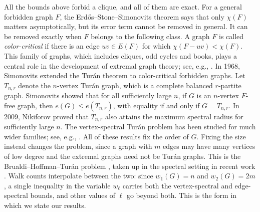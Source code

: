 \documentclass[11pt, a4paper]{article}
\theoremstyle{definition}
\theoremstyle{plain}
\renewcommand{\le}{\leqslant}
\begin{document}
\smallskip 

All the bounds above forbid a clique, and all of them are exact. For a general forbidden graph $F$, the Erd\H{o}s--Stone--Simonovits theorem says that only $\chi (F)$ matters asymptotically, but its error term cannot be removed in general. 
It can be removed exactly when $F$ belongs to the following class. 
A graph $F$ is called {\it color-critical} if there is an edge $uv\in E(F)$ for which $\chi(F- uv)<\chi(F)$. 
 This family of graphs, which includes cliques, odd cycles and books, plays a central role in the
development of extremal graph theory; see, e.g., \cite{Mub2010,PY2017,ZhaiLin2023}. 
In 1968, Simonovits \cite{Sim1968} extended the Tur\'{a}n theorem to color-critical forbidden graphs. 
 Let $T_{n,r}$ denote the $n$-vertex Tur\'{a}n graph, which is a complete balanced $r$-partite graph. Simonovits showed that for all sufficiently large $n$, if $G$ is an $n$-vertex $F$-free graph, 
 then $e(G)\le e(T_{n,r})$, with equality if and only if $G=T_{n,r}$. 
In 2009,  Nikiforov \cite{Nik2009-critical} proved that $T_{n,r}$ also attains the maximum spectral radius for sufficiently large $n$.  The vertex-spectral Tur\'an problem has been studied for much wider families; see, e.g., \cite{TT2017, CDT2023,  BDT2025,  WKX2023, ZL2022jctb}.   
All of these results fix the order of $G$. Fixing the size instead changes the problem,
since a graph with $m$ edges may have many vertices of low degree and the extremal graphs need not be Tur\'an graphs. 
This is the Brualdi--Hoffman--Tur\'an problem \cite{BH1985, Row1988}, taken up in the spectral setting in recent work \cite{LZS2024, LZZ2025, LLLY2026, LLZ-ESS, LLZ-Critical}. 
Walk counts interpolate between the two: since $w_1(G)=n$ and $w_2(G)=2m$, a single inequality in the variable $w_\ell$ carries both the vertex-spectral and edge-spectral bounds, and other values of $\ell$ go beyond both. This is the form in which we state our results. 
\end{document}
